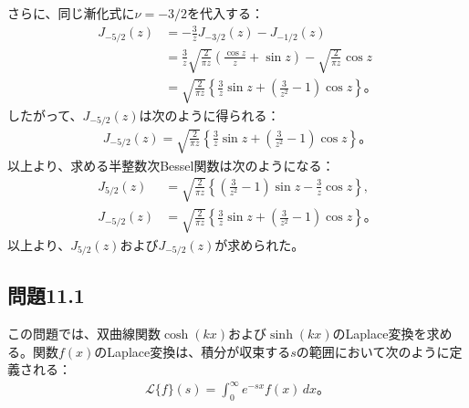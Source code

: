 \documentclass[platex,dvipdfmx,a4paper]{jsarticle}
\begin{document}
  さらに、同じ漸化式に$\nu=-3/2$を代入する：
  \begin{align*}
    J_{-5/2}(z)
    &=-\frac{3}{z}J_{-3/2}(z)-J_{-1/2}(z)\\
    &=\frac{3}{z}\sqrt{\frac{2}{\pi z}}
    \left(\frac{\cos z}{z}+\sin z\right)
    -\sqrt{\frac{2}{\pi z}}\cos z\\
    &=\sqrt{\frac{2}{\pi z}}
    \left\{\frac{3}{z}\sin z+\left(\frac{3}{z^2}-1\right)\cos z\right\}。
  \end{align*}
  したがって、$J_{-5/2}(z)$は次のように得られる：
  \begin{align*}
    J_{-5/2}(z)
    =\sqrt{\frac{2}{\pi z}}
    \left\{\frac{3}{z}\sin z+\left(\frac{3}{z^2}-1\right)\cos z\right\}。
  \end{align*}
  以上より、求める半整数次Bessel関数は次のようになる：
  \begin{align*}
    J_{5/2}(z)
    &=\sqrt{\frac{2}{\pi z}}
    \left\{\left(\frac{3}{z^2}-1\right)\sin z-\frac{3}{z}\cos z\right\},\\
    J_{-5/2}(z)
    &=\sqrt{\frac{2}{\pi z}}
    \left\{\frac{3}{z}\sin z+\left(\frac{3}{z^2}-1\right)\cos z\right\}。
  \end{align*}
  以上より、$J_{5/2}(z)$および$J_{-5/2}(z)$が求められた。

  \subsection*{問題11.1}

  この問題では、双曲線関数$\cosh(kx)$および$\sinh(kx)$のLaplace変換を求める。関数$f(x)$のLaplace変換は、積分が収束する$s$の範囲において次のように定義される：
  \begin{align*}
    \mathcal{L}\{f\}(s)=\int_0^\infty e^{-sx}f(x)\,dx。
  \end{align*}
  
\end{document}
